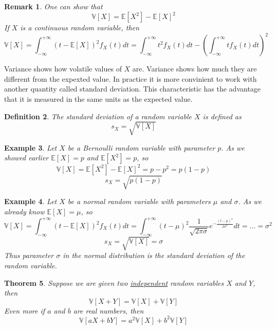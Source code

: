 \documentclass[12pt]{article}
\newtheorem{theorem}{Theorem}[subsection]
\newtheorem{remark}[theorem]{Remark}
\newtheorem{definition}[theorem]{Definition}
\newtheorem{example}[theorem]{Example}
\begin{document}
\begin{remark} One can show that
    $$
        \mathbb{V}[X]=\mathbb{E}[X^2]-{\mathbb{E}[X]}^2
    $$
    If $X$ is a continuous random variable, then
    $$
        \mathbb{V}[X]
        =\int_{-\infty}^{+\infty} {(t-\mathbb{E}[X])}^2 f_X(t)dt
        =\int_{-\infty}^{+\infty} t^2 f_X(t)dt-
        {\left( \int_{-\infty}^{+\infty} t f_X(t)dt\right)}^2
    $$
\end{remark}

Variance shows how volatile values of $X$ are. Variance shows how much they are
different from the expexted value. In practice it is more convinient to work
with another quantity called standard deviation. This characteristic has the
advantage that it is measured in the same units as the expected value.

\begin{definition} The standard deviation of a random variable $X$ is defined as
    $$
        s_X=\sqrt{\mathbb{V}[X]}
    $$
\end{definition}

\begin{example} Let $X$ be a Bernoulli random variable with parameter $p$. As we
    showed earlier $\mathbb{E}[X]=p$ and $\mathbb{E}[X^2]=p$, so
    $$
        \mathbb{V}[X]=\mathbb{E}[X^2]-{\mathbb{E}[X]}^2=p-p^2=p(1-p)
    $$
    $$
        s_X=\sqrt{p(1-p)}
    $$
\end{example}

\begin{example} Let $X$ be a normal random variable with parameters $\mu$ and
    $\sigma$. As we already know $\mathbb{E}[X]=\mu$, so
    $$
        \mathbb{V}[X]
        =\int_{-\infty}^{+\infty}{(t-\mathbb{E}[X])}^2 f_X(t)dt
        =\int_{-\infty}^{+\infty}{(t-\mu)}^2
        \frac{1}{\sqrt{2\pi\sigma}}e^{-\frac{{(t-\mu)}^2}{2\sigma^2}}dt
        =\ldots
        =\sigma^2
    $$
    $$
        s_X=\sqrt{\mathbb{V}[X]}=\sigma
    $$
    Thus parameter $\sigma$ in the normal distribution is the standard deviation
    of the random variable.
\end{example}

\begin{theorem} Suppose we are given two \underline{independent} random
    variables $X$ and $Y$, then
    $$
        \mathbb{V}[X+Y]=\mathbb{V}[X]+\mathbb{V}[Y]
    $$
    Even more if $a$ and $b$ are real numbers, then
    $$
        \mathbb{V}[aX+bY]=a^2\mathbb{V}[X]+b^2\mathbb{V}[Y]
    $$
\end{theorem}
\end{document}
